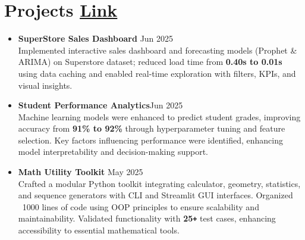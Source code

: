\documentclass[10 pt, letterpaper]{article}
\begin{document}
\section*{Projects \textbar \href{https://github.com/Seetharamanrs?tab=repositories} {Link}}
\begin{itemize}
 \item \textbf{SuperStore Sales Dashboard } \hfill{Jun 2025} \\Implemented interactive sales dashboard and forecasting models (Prophet \& ARIMA) on Superstore dataset; reduced load time from \textbf{0.40s to 0.01s} using data caching and enabled real-time exploration with filters, KPIs, and visual insights.



    \vspace{-0.23cm}
     \item \textbf{Student Performance Analytics}\hfill{Jun 2025} \\Machine learning models were enhanced to predict student grades, improving accuracy from \textbf{91\% to 92\%} through hyperparameter tuning and feature selection. Key factors influencing performance were identified, enhancing model interpretability and decision-making support.

    \vspace{-0.23cm}
    \item\textbf{Math Utility Toolkit }\hfill{ May 2025}\\ Crafted a modular Python toolkit integrating calculator, geometry, statistics, and sequence generators with CLI and Streamlit GUI interfaces. Organized ~1000 lines of code using OOP principles to ensure scalability and maintainability. Validated functionality with \textbf{25\texttt{+}} test cases, enhancing accessibility to essential mathematical tools.


\end{itemize}
\end{document}
